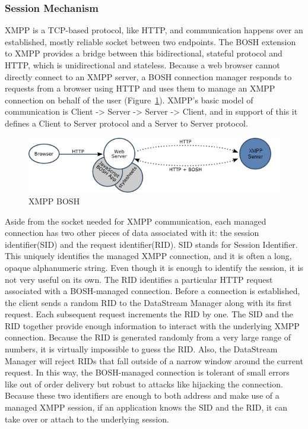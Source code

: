\subsubsection{Session Mechanism}
XMPP is a TCP-based protocol, like HTTP, and communication happens over an established, mostly reliable socket between two endpoints. The BOSH extension to XMPP provides a bridge between this bidirectional, stateful protocol and HTTP, which is unidirectional and stateless. Because a web browser cannot directly connect to an XMPP server, a BOSH connection manager responds to requests from a browser using HTTP and uses them to manage an XMPP connection on behalf of the user (Figure~\ref{img:xmpp-bosh}).  XMPP's basic model of communication is Client -> Server -> Server -> Client, and in support of this it defines a Client to Server protocol and a Server to Server protocol.
  \begin{figure}[!ht]
  \centering
  \includegraphics[scale=0.6]{images/xmpp-bosh.png}   
  \caption[BOSH]{XMPP BOSH}
  \label{img:xmpp-bosh}                        
  \end{figure} 

Aside from the socket needed for XMPP communication, each managed connection has two other pieces of data associated with it: the session identifier(SID) and the request identifier(RID). SID stands for Session Identifier. This uniquely identifies the managed XMPP connection, and it is often a long, opaque alphanumeric string. Even though it is enough to identify the session, it is not very useful on its own. The RID identifies a particular HTTP request associated with a BOSH-managed connection. Before a connection is established, the client sends a random RID to the DataStream Manager along with its first request. Each subsequent request increments the RID by one. The SID and the RID together provide enough information to interact with the underlying XMPP connection. Because the RID is generated randomly from a very large range of numbers, it is virtually impossible to guess the RID. Also, the DataStream Manager will reject RIDs that fall outside of a narrow window around the current request. In this way, the BOSH-managed connection is tolerant of small errors like out of order delivery but robust to attacks like hijacking the connection. Because these two identifiers are enough to both address and make use of a managed XMPP session, if an application knows the SID and the RID, it can take over or attach to the underlying session.

